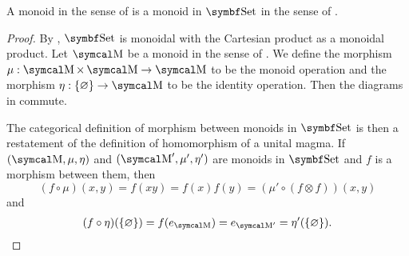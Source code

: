 \begin{proposition}\label{thm:monoids_are_monoids_in_set}
  A monoid in the sense of  is a monoid in \( \Cat{Set} \) in the sense of .
\end{proposition}
\begin{proof}
  By , \( \Cat{Set} \) is monoidal with the Cartesian product as a monoidal product. Let \( \CM \) be a monoid in the sense of . We define the morphism \( \mu: \CM \times \CM \to \CM \) to be the monoid operation and the morphism \( \eta: \{ \varnothing \} \to \CM \) to be the identity operation. Then the diagrams in  commute.

  The categorical definition of morphism between monoids in \( \Cat{Set} \) is then a restatement of the definition of homomorphism of a unital magma. If \( (\CM, \mu, \eta) \) and \( (\CM', \mu', \eta') \) are monoids in \( \Cat{Set} \) and \( f \) is a morphism between them, then
  \begin{equation*}
    (f \circ \mu)(x, y)
    =
    f(xy)
    =
    f(x) f(y)
    =
    (\mu' \circ (f \otimes f))(x, y)
  \end{equation*}
  and
  \begin{equation*}
    (f \circ \eta)(\{ \varnothing \})
    =
    f(e_{\CM})
    =
    e_{\CM'}
    =
    \eta'(\{ \varnothing \}).
  \end{equation*}
\end{proof}

